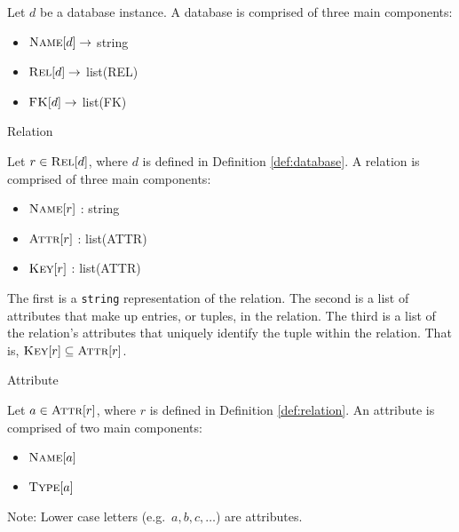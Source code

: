 		\begin{defn}
		\label{def:database}
			Let $d$ be a database instance.  A database is comprised of three main components:
			
			\begin{itemize}
				\item $\textsc{Name}\lbrack d\rbrack \rightarrow$ string
				\item $\textsc{Rel}\lbrack d\rbrack \rightarrow$ list(REL)
				\item $\textsc{FK}\lbrack d\rbrack \rightarrow$ list(FK)
			\end{itemize}
		\end{defn}
		
		\begin{defn}{Relation}
		\label{def:relation}
		
			Let $r \in \textsc{Rel}\lbrack d\rbrack$, where $d$ is defined in Definition \ref{def:database}.  A relation is comprised of three main components:
			
			\begin{itemize}
				\item $\textsc{Name}\lbrack r\rbrack$ : string
				\item $\textsc{Attr}\lbrack r\rbrack$ : list(ATTR)
				\item $\textsc{Key}\lbrack r\rbrack$ : list(ATTR)
			\end{itemize}
			
			The first is a \texttt{string} representation of the relation.  The second is a list of attributes that make up entries, or tuples, in the relation.  The third is a list of the relation's attributes that uniquely identify the tuple within the relation.  That is, $\textsc{Key}\lbrack r\rbrack \subseteq \textsc{Attr}\lbrack r\rbrack$.
		\end{defn}
		
		\begin{defn}{Attribute}
		
			Let $a \in \textsc{Attr}\lbrack r\rbrack$, where $r$ is defined in Definition \ref{def:relation}.  An attribute is comprised of two main components:
			
			\begin{itemize}
				\item $\textsc{Name}\lbrack a\rbrack$
				\item $\textsc{Type}\lbrack a\rbrack$
			\end{itemize}
		
			Note:  Lower case letters (e.g.\ $a, b, c, \ldots$) are attributes.
		\end{defn}
		
